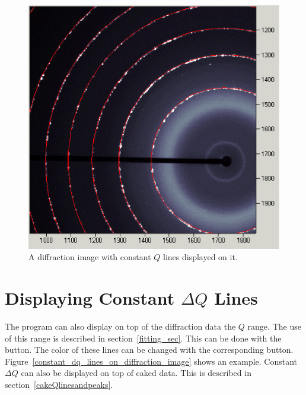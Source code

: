 \begin{figure}
    \centering
    \includegraphics[scale=.75]
        {figures/constant_q_lines_on_diffraction_image.eps}
    \caption{A diffraction image with constant 
    $Q$ lines displayed on it.}
    \label{constant_q_lines_on_diffraction_image}
\end{figure}

\section{\texorpdfstring{Displaying Constant $\Delta Q$ 
    Lines}{Displaying Constant delta Q Lines}}
    \label{displayconstdQlines}

The program can also display on top of the diffraction
data the $Q$ range. The use of this range is 
described in section~\ref{fitting_sec}. 
This can be done with the  button.
The color of these lines can be changed with the
corresponding  button. 
Figure~\ref{constant_dq_lines_on_diffraction_image}
shows an example.
Constant $\Delta Q$ can also be displayed on top 
of caked data. This is described in 
section~\ref{cakeQlinesandpeaks}.

